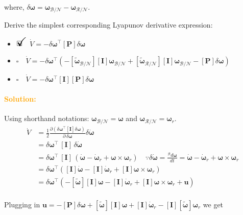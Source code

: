 \documentclass[12pt, a4paper]{article}
\newcommand{\ans}{\item[]$\rlap{\LARGE{\checkmark}}\square\quad$}
\newcommand{\noans}{\item[]$\square\quad$}
\begin{document}
where, $\delta\bm{\omega}=\bm{\omega}_{\mathcal{B}/\mathcal{N}}-\bm{\omega}_{\mathcal{R}/\mathcal{N}}$.

Derive the simplest corresponding Lyapunov
derivative expression:

\begin{itemize}
\ans $\dot{V} = -\delta \bm{\omega}^{\intercal}[\bm{P}]\delta\bm{\omega}$
\noans $\dot{V} = -\delta \bm{\omega}^{\intercal} \left(- [\tilde{\bm{\omega}}_{\mathcal{B}/\mathcal{N}}][\bm{I}] \bm{\omega}_{\mathcal{B}/\mathcal{N}} + [\tilde{\bm{\omega}}_{\mathcal{R}/\mathcal{N}}][\bm{I}] \bm{\omega}_{\mathcal{B}/\mathcal{N}} - [\bm{P}]\delta\bm{\omega} \right)$
\noans $\dot{V} = -\delta \bm{\omega}^{\intercal}[\bm{I}][\bm{P}]\delta{\bm{\omega}}$
\end{itemize}

\paragraph{\textcolor{orange}{Solution:}} Using shorthand notations: $\bm{\omega}_{\mathcal{B}/\mathcal{N}}=\bm{\omega}$ and $\bm{\omega}_{\mathcal{R}/\mathcal{N}}=\bm{\omega}_{r}$.
\begin{equation*}
    \begin{split}
        \dot{V}&=\frac{1}{2}\frac{\partial(\delta\bm{\omega}^{\intercal}[\bm{I}]\delta\bm{\omega})}{\partial\,\delta\bm{\omega}}\delta\dot{\bm{\omega}}\\
        &=\delta\bm{\omega}^{\intercal}\,[\bm{I}]\,\delta\dot{\bm{\omega}}\quad\quad\\
        &=\delta\bm{\omega}^{\intercal}\,[\bm{I}]\,(\dot{\bm{\omega}}-\dot{\bm{\omega}}_{r}+\bm{\omega}\times\bm{\omega}_{r})\quad\because\delta\dot{\bm{\omega}}=\frac{{}^{\mathcal{B}}d\bm{\omega}}{dt}=\dot{\bm{\omega}}-\dot{\bm{\omega}}_{r}+\bm{\omega}\times\bm{\omega}_{r}\\
        &=\delta\bm{\omega}^{\intercal}([\bm{I}]\dot{\bm{\omega}}-[\bm{I}]\dot{\bm{\omega}}_{r}+[\bm{I}]\bm{\omega}\times\bm{\omega}_{r})\\
        &=\delta\bm{\omega}^{\intercal}(-[\tilde{\bm{\omega}}][\bm{I}]\bm{\omega}-[\bm{I}]\dot{\bm{\omega}}_{r}+[\bm{I}]\bm{\omega}\times\bm{\omega}_{r}+\bm{u})\\
    \end{split}
\end{equation*}

Plugging in $\bm{u}=-[\bm{P}]\delta\bm{\omega}+[\tilde{\bm{\omega}}][\bm{I}]\bm{\omega}+[\bm{I}]\dot{\bm{\omega}}_{r}-[\bm{I}][\tilde{\bm{\omega}}]\bm{\omega}_{r}$ we get
\end{document}
